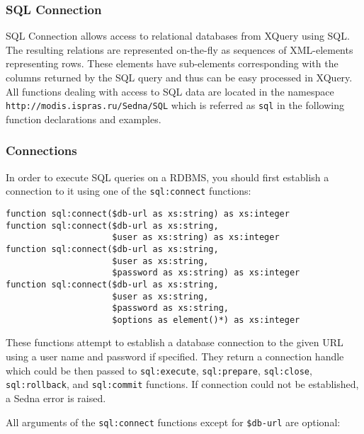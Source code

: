 \documentclass[a4paper,12pt]{article}
\begin{document}
\subsubsection{SQL Connection}

SQL Connection allows access to relational databases from XQuery using SQL. The
resulting relations are represented on-the-fly as sequences of XML-elements
representing rows. These elements have sub-elements corresponding with the
columns returned by the SQL query and thus can be easy processed in XQuery. All
functions dealing with access to SQL data are located in the namespace
\verb!http://modis.ispras.ru/Sedna/SQL! which is referred as \verb!sql! in the
following function declarations and examples.


\subsubsection*{Connections} In order to execute SQL queries on a RDBMS, you
should first establish a connection to it using one of the \verb!sql:connect!
functions:

\begin{verbatim}
function sql:connect($db-url as xs:string) as xs:integer
function sql:connect($db-url as xs:string,
                     $user as xs:string) as xs:integer
function sql:connect($db-url as xs:string,
                     $user as xs:string,
                     $password as xs:string) as xs:integer
function sql:connect($db-url as xs:string,
                     $user as xs:string,
                     $password as xs:string,
                     $options as element()*) as xs:integer
\end{verbatim}

These functions attempt to establish a database connection to the given URL
using a user name and password if specified. They return a connection handle
which could be then passed to \verb!sql:execute!, \verb!sql:prepare!,
\verb!sql:close!, \verb!sql:rollback!, and \verb!sql:commit! functions. If
connection could not be established, a Sedna error is raised.

All arguments of the \verb!sql:connect! functions except for \verb!$db-url! are
optional:
\end{document}
